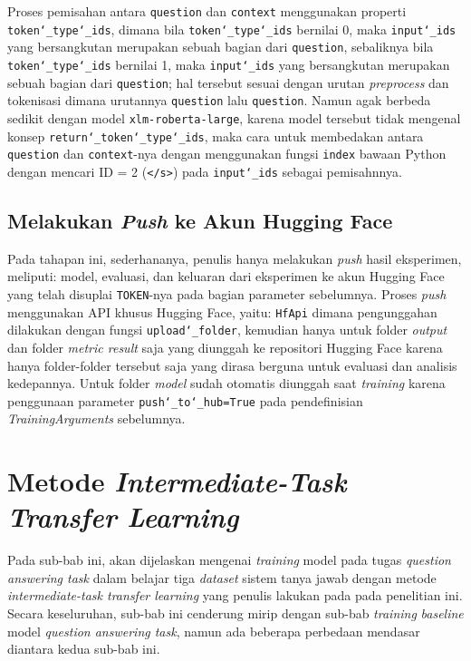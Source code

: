 Proses pemisahan antara \texttt{question} dan \texttt{context} menggunakan properti \texttt{token\char`_type\char`_ids}, dimana bila \texttt{token\char`_type\char`_ids} bernilai 0, maka \texttt{input\char`_ids} yang bersangkutan merupakan sebuah bagian dari \texttt{question}, sebaliknya bila \texttt{token\char`_type\char`_ids} bernilai 1, maka \texttt{input\char`_ids} yang bersangkutan merupakan sebuah bagian dari \texttt{question}; hal tersebut sesuai dengan urutan \emph{preprocess} dan tokenisasi dimana urutannya \texttt{question} lalu \texttt{question}. Namun agak berbeda sedikit dengan model \texttt{xlm-roberta-large}, karena model tersebut tidak mengenal konsep \texttt{return\char`_token\char`_type\char`_ids}, maka cara untuk membedakan antara \texttt{question} dan \texttt{context}-nya dengan menggunakan fungsi \texttt{index} bawaan Python dengan mencari ID = 2 (\texttt{</s>}) pada \texttt{input\char`_ids} sebagai pemisahnnya. 

\subsection{Melakukan \emph{Push} ke Akun Hugging Face}
Pada tahapan ini, sederhananya, penulis hanya melakukan \emph{push} hasil eksperimen, meliputi: model, evaluasi, dan keluaran dari eksperimen ke akun Hugging Face yang telah disuplai \texttt{TOKEN}-nya pada bagian parameter sebelumnya. Proses \emph{push} menggunakan API khusus Hugging Face, yaitu: \texttt{HfApi} dimana pengunggahan dilakukan dengan fungsi \texttt{upload\char`_folder}, kemudian hanya untuk folder \emph{output} dan folder \emph{metric result} saja yang diunggah ke repositori Hugging Face karena hanya folder-folder tersebut saja yang dirasa berguna untuk evaluasi dan analisis kedepannya. Untuk folder \emph{model} sudah otomatis diunggah saat \emph{training} karena penggunaan parameter \texttt{push\char`_to\char`_hub=True} pada pendefinisian \emph{TrainingArguments} sebelumnya.

\section{Metode \emph{Intermediate-Task Transfer Learning}}
Pada sub-bab ini, akan dijelaskan mengenai \emph{training} model pada tugas \emph{question answering task} dalam belajar tiga \emph{dataset} sistem tanya jawab dengan metode \emph{intermediate-task transfer learning} yang penulis lakukan pada pada penelitian ini. Secara keseluruhan, sub-bab ini cenderung mirip dengan sub-bab \emph{training} \emph{baseline} model \emph{question answering task}, namun ada beberapa perbedaan mendasar diantara kedua sub-bab ini.

